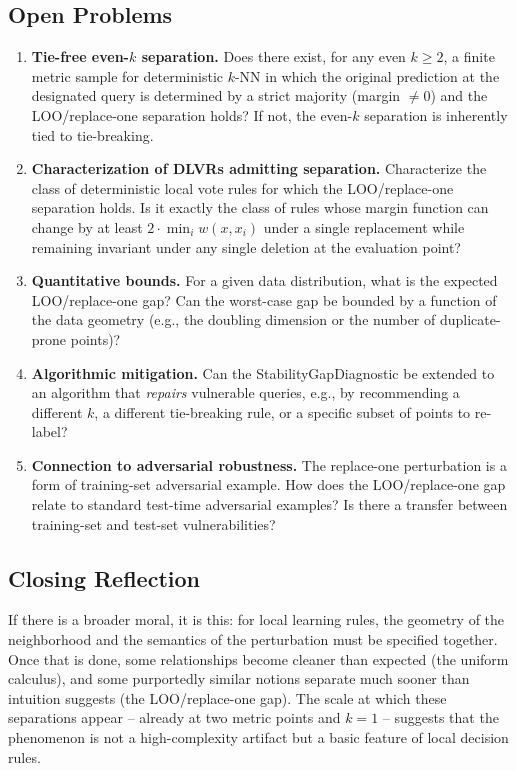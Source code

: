 \subsection{Open Problems}

\begin{enumerate}[leftmargin=*,label=(\arabic*)]

    \item \textbf{Tie-free even-$k$ separation.}
    Does there exist, for any even $k \ge 2$, a finite metric sample for
    deterministic $k$-NN in which the original prediction at the designated
    query is determined by a strict majority (margin $\neq 0$) and the
    LOO/replace-one separation holds? If not, the even-$k$ separation is
    inherently tied to tie-breaking.

    \item \textbf{Characterization of DLVRs admitting separation.}
    Characterize the class of deterministic local vote rules for which the
    LOO/replace-one separation holds. Is it exactly the class of rules whose
    margin function can change by at least $2 \cdot \min_i w(x,x_i)$ under a
    single replacement while remaining invariant under any single deletion at
    the evaluation point?

    \item \textbf{Quantitative bounds.}
    For a given data distribution, what is the expected LOO/replace-one gap?
    Can the worst-case gap be bounded by a function of the data geometry (e.g.,
    the doubling dimension or the number of duplicate-prone points)?

    \item \textbf{Algorithmic mitigation.}
    Can the StabilityGapDiagnostic be extended to an algorithm that
    \emph{repairs} vulnerable queries, e.g., by recommending a different $k$,
    a different tie-breaking rule, or a specific subset of points to re-label?

    \item \textbf{Connection to adversarial robustness.}
    The replace-one perturbation is a form of training-set adversarial example.
    How does the LOO/replace-one gap relate to standard test-time adversarial
    examples? Is there a transfer between training-set and test-set
    vulnerabilities?

\end{enumerate}

\subsection{Closing Reflection}

If there is a broader moral, it is this: for local learning rules, the geometry
of the neighborhood and the semantics of the perturbation must be specified
together. Once that is done, some relationships become cleaner than expected
(the uniform calculus), and some purportedly similar notions separate much
sooner than intuition suggests (the LOO/replace-one gap). The scale at which
these separations appear -- already at two metric points and $k=1$ -- suggests
that the phenomenon is not a high-complexity artifact but a basic feature of
local decision rules.
